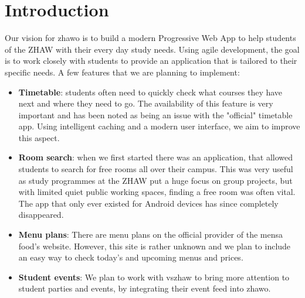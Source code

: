 \section{Introduction}
  Our vision for zhawo is to build a modern Progressive Web App to help students of the ZHAW with their every day study needs. Using agile development, the goal is to work closely with students to provide an application that is tailored to their specific needs.
  A few features that we are planning to implement:
  \begin{itemize}
    \item \textbf{Timetable}: students often need to quickly check what courses they have next and where they need to go. The availability of this feature is very important and has been noted as being an issue with the "official" timetable app. Using intelligent caching and a modern user interface, we aim to improve this aspect.
    \item \textbf{Room search}: when we first started there was an application, that allowed students to search for free rooms all over their campus. This was very useful as study programmes at the ZHAW put a huge focus on group projects, but with limited quiet public working spaces, finding a free room was often vital. The app that only ever existed for Android devices has since completely disappeared.
    \item \textbf{Menu plans}: There are menu plans on the official provider of the mensa food's website. However, this site is rather unknown and we plan to include an easy way to check today's and upcoming menus and prices.
    \item \textbf{Student events}: We plan to work with vszhaw to bring more attention to student parties and events, by integrating their event feed into zhawo.
  \end{itemize}
